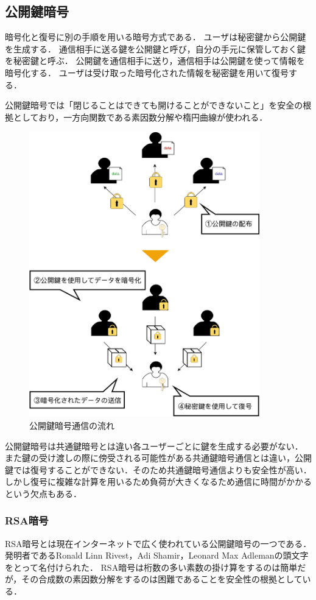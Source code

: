 \documentclass[a4j,12pt]{jsarticle}
\begin{document}
\newpage
\subsection{公開鍵暗号}

暗号化と復号に別の手順を用いる暗号方式である．
ユーザは秘密鍵から公開鍵を生成する．
通信相手に送る鍵を公開鍵と呼び，自分の手元に保管しておく鍵を秘密鍵と呼ぶ．
公開鍵を通信相手に送り，通信相手は公開鍵を使って情報を暗号化する．
ユーザは受け取った暗号化された情報を秘密鍵を用いて復号する．

公開鍵暗号では「閉じることはできても開けることができないこと」を安全の根拠としており，一方向関数である素因数分解や楕円曲線が使われる．



\begin{figure}[H]
\centering
\includegraphics[width=10cm]{kokai.pdf}
\caption{公開鍵暗号通信の流れ}
\label{fig:no}
\end{figure} 

公開鍵暗号は共通鍵暗号とは違い各ユーザーごとに鍵を生成する必要がない．
また鍵の受け渡しの際に傍受される可能性がある共通鍵暗号通信とは違い，公開鍵では復号することができない．そのため共通鍵暗号通信よりも安全性が高い．しかし復号に複雑な計算を用いるため負荷が大きくなるため通信に時間がかかるという欠点もある．



\subsubsection{RSA暗号}
RSA暗号とは現在インターネットで広く使われている公開鍵暗号の一つである．
発明者であるRonald Linn Rivest，Adi Shamir，Leonard Max Adlemanの頭文字をとって名付けられた．
RSA暗号は桁数の多い素数の掛け算をするのは簡単だが，その合成数の素因数分解をするのは困難であることを安全性の根拠としている．
\end{document}
